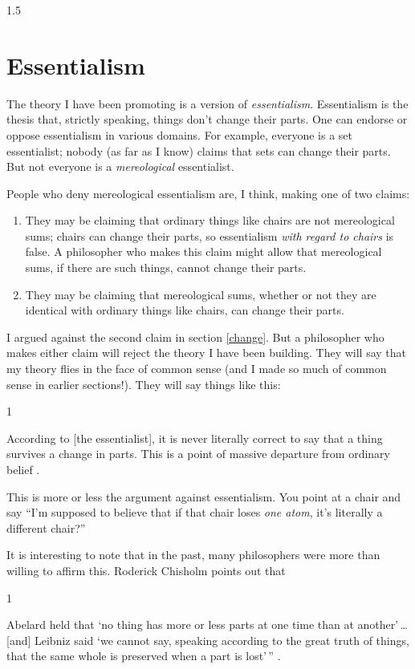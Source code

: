 \documentclass[11pt]{article}
\newenvironment{squote}{%
\begin{spacing}{1}
\begin{list}{}{%
\setlength{\labelwidth}{0pt}%
\rightmargin\leftmargin%
}
\item\relax
}{%
\end{list}%
\end{spacing}
}
\begin{document}
\begin{spacing}{1.5}
\section{Essentialism}
\label{essentialism}
The theory I have been promoting is a version of {\em essentialism}.
Essentialism is the thesis that, strictly speaking, things don't
change their parts.  One can endorse or oppose essentialism in various
domains.  For example, everyone is a set essentialist; nobody (as far
as I know) claims that sets can change their parts.  But not everyone
is a {\em mereological} essentialist.

People who deny mereological essentialism are, I think, making one of
two claims:

\begin{enumerate}
  \item They may be claiming that ordinary things like chairs are not
    mereological sums; chairs can change their parts, so essentialism
    {\em with regard to chairs} is false.  A philosopher who makes
    this claim might allow that mereological sums, if there are such
    things, cannot change their parts.
  \item They may be claiming that mereological sums, whether or not
    they are identical with ordinary things like chairs, can change
    their parts.
\end{enumerate}

I argued against the second claim in section \ref{change}.  But a
philosopher who makes either claim will reject the theory I have been
building.  They will say that my theory flies in the face of common
sense (and I made so much of common sense in earlier sections!).  They
will say things like this:

\begin{squote}
According to [the essentialist], it is never literally correct to say
that a thing survives a change in parts.  This is a point of massive
departure from ordinary belief \citep[184]{sider2001}.
\end{squote}

This is more or less the argument against essentialism.  You point at
a chair and say ``I'm supposed to believe that if that chair loses
{\em one atom}, it's literally a different chair?''

It is interesting to note that in the past, many philosophers were
more than willing to affirm this.  Roderick Chisholm points out that

\begin{squote}
Abelard held that `no thing has more or less parts at one time than at
another'\,\ldots [and] Leibniz said `we cannot say, speaking according
to the great truth of things, that the same whole is preserved when a
part is lost'\,'' \citeyearpar[145]{chisholm1979}.
\end{squote}


\end{spacing}
\end{document}
